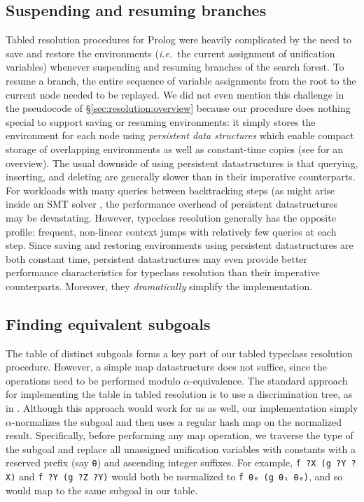 \documentclass[runningheads]{llncs}
\newcommand\ie{\emph{i.e.}\ }
\begin{document}
\subsection{Suspending and resuming branches}
Tabled resolution procedures for Prolog were heavily complicated by the need
to save and restore the environments (\ie the current assignment of unification variables)
whenever suspending and resuming branches of the search forest.
To resume a branch, the entire sequence of variable assignments from the root to the current node
needed to be replayed.
We did not even mention this challenge in the pseudocode of \S\ref{sec:resolution:overview}
because our procedure does nothing special to support saving or resuming environments:
it simply stores the environment for each node using \emph{persistent data structures}
which enable compact storage of overlapping environments as well as
constant-time copies (see \cite{kaplan2018persistent} for an overview).
The usual downside of using persistent datastructures is that querying, inserting, and deleting
are generally slower than in their imperative counterparts.
For workloads with many queries between backtracking steps (as might arise inside an SMT solver \cite{barrett2018satisfiability},
the performance overhead of persistent datastructures may be devastating.
However, typeclass resolution generally has the opposite profile:
frequent, non-linear context jumps with relatively few queries at each step.
Since saving and restoring environments using persistent datastructures are both constant time,
persistent datastructures may even provide better performance characteristics for typeclass resolution than their imperative counterparts.
Moreover, they \emph{dramatically} simplify the implementation.

\subsection{Finding equivalent subgoals}
\label{sec:resolution:details:table}
The table of distinct subgoals forms a key part of our tabled typeclass resolution procedure.
However, a simple map datastructure does not suffice, since the operations need to be performed modulo $\alpha$-equivalence.
The standard approach for implementing the table in tabled resolution is to use a discrimination tree,
as in \cite{sagonas1998abstract}. Although this approach would work for us as well, our implementation
simply $\alpha$-normalizes the subgoal and then uses a regular hash map on the normalized result.
Specifically, before performing any map operation, we traverse the type of the subgoal and replace all unassigned unification variables with
constants with a reserved prefix (say \lstinline{θ}) and ascending integer suffixes. For example,
\lstinline{f ?X (g ?Y ?X)} and \lstinline{f ?Y (g ?Z ?Y)} would both be normalized to \lstinline{f θ₀ (g θ₁ θ₀)},
and so would map to the same subgoal in our table.
\end{document}
